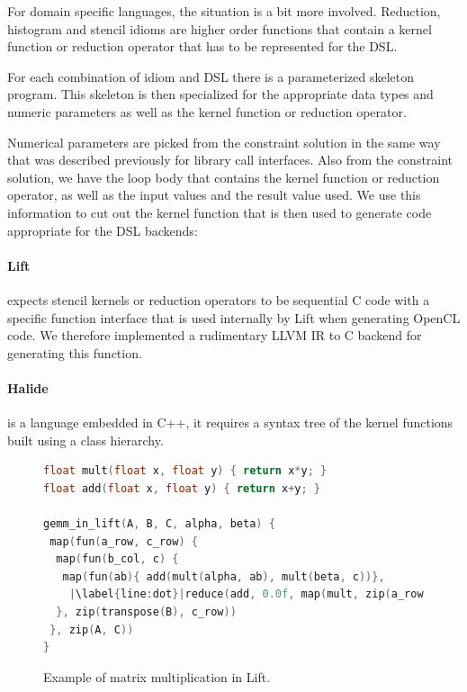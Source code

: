     For domain specific languages, the situation is a bit more involved.
    Reduction, histogram and stencil idioms are higher order functions that
    contain a kernel function or reduction operator that has to be represented
    for the DSL.

    For each combination of idiom and DSL there is a parameterized
    skeleton program.
    This skeleton is then specialized for the appropriate data types and numeric
    parameters as well as the kernel function or reduction operator.

    Numerical parameters are picked from the constraint solution in the same way
    that was described previously for library call interfaces.
    Also from the constraint solution, we have the loop body that contains the
    kernel function or reduction operator, as well as the input values and the
    result value used.
    We use this information to cut out the kernel function that is then used to
    generate code appropriate for the DSL backends:

\paragraph{Lift}  expects stencil kernels or reduction operators to be sequential C code with a specific function interface that
is used internally by Lift when generating OpenCL code.
We therefore implemented a rudimentary LLVM IR to C backend for generating this function.

\paragraph{Halide} is a language embedded in C++, it requires a syntax tree of the kernel functions built using a class hierarchy.

\begin{figure}[ht]
\begin{lstlisting}[language=C,escapechar=|]
float mult(float x, float y) { return x*y; }
float add(float x, float y) { return x+y; }

gemm_in_lift(A, B, C, alpha, beta) {
 map(fun(a_row, c_row) {
  map(fun(b_col, c) {
   map(fun(ab){ add(mult(alpha, ab), mult(beta, c))},
    |\label{line:dot}|reduce(add, 0.0f, map(mult, zip(a_row, b_col))))
  }, zip(transpose(B), c_row))
 }, zip(A, C))
}
\end{lstlisting}
\vspace{-.3cm}
\caption{Example of matrix multiplication in Lift.}
\label{fig:liftmxm}
\vspace{-1em}
\end{figure}

